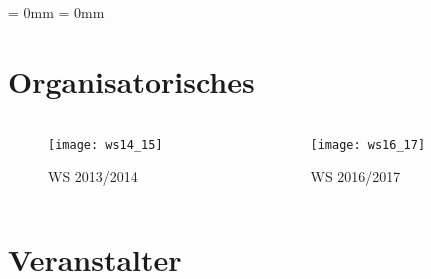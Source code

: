 

\usepackage{listings}
\usepackage{tikz}
\usepackage{tabularx,booktabs,multirow,multicol,colortbl}
\aboverulesep = 0mm \belowrulesep = 0mm

\def\streamlink{https://www.youtube.com/d120de/live}
\def\moodlecourselink{https://moodle.informatik.tu-darmstadt.de/course/view.php?id=1636}



\maketitle

\section{Organisatorisches}
\begin{frame}
    \slidehead
    \begin{columns}
        \begin{column}{6cm}
            \begin{figure}
                \centering
                \texttt{[image: ws14\_15]}
                \caption{WS 2013/2014}
            \end{figure}
        \end{column}
        \begin{column}{6cm}
            \begin{figure}
                \centering
                \texttt{[image: ws16\_17]}
                \caption{WS 2016/2017}
            \end{figure}
        \end{column}
    \end{columns}
\end{frame}

\section{Veranstalter}
